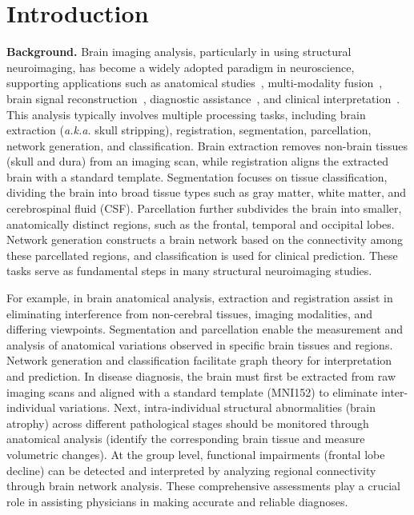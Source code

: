 \section{Introduction}
\label{sec:intro}

\textbf{Background.} 
Brain imaging analysis, particularly in using structural neuroimaging, has become a widely adopted paradigm in neuroscience, supporting applications such as anatomical studies~\cite{zhang2024brant,yin2023multi,papalexakis2014good},
multi-modality fusion~\cite{cai2018deep}, brain signal reconstruction~\cite{luo2024brain,scotti2024reconstructing}, diagnostic assistance~\cite{sun2009mining,huang2011brain}, and clinical interpretation~\cite{li2021braingnn}.
This analysis typically involves multiple processing tasks, including brain extraction (\emph{a.k.a.} skull stripping), registration, segmentation, parcellation, network generation, and classification. 
Brain extraction removes non-brain tissues (\eg skull and dura) from an imaging scan, while registration aligns the extracted brain with a standard template. Segmentation focuses on tissue classification, dividing the brain into broad tissue types such as gray matter, white matter, and cerebrospinal fluid (CSF). Parcellation further subdivides the brain into smaller, anatomically distinct regions, such as the frontal, temporal and occipital lobes. Network generation constructs a brain network based on the connectivity among these parcellated regions, and classification is used for clinical prediction. These tasks serve as fundamental steps in many structural neuroimaging studies.

For example, in brain anatomical analysis, extraction and registration assist in eliminating interference from non-cerebral tissues, imaging modalities, and differing viewpoints. Segmentation and parcellation enable the measurement and analysis of anatomical variations observed in specific brain tissues and regions.
Network generation and classification facilitate graph theory for interpretation and prediction. 
In disease diagnosis, the brain must first be extracted from raw imaging scans and aligned with a standard template (\eg MNI152) to eliminate inter-individual variations. Next, intra-individual structural abnormalities (\eg brain atrophy) across different pathological stages should be monitored through anatomical analysis (\eg identify the corresponding brain tissue and measure volumetric changes). At the group level, functional impairments (\eg frontal lobe decline) can be detected and interpreted by analyzing regional connectivity through brain network analysis. These comprehensive assessments play a crucial role in assisting physicians in making accurate and reliable diagnoses.

